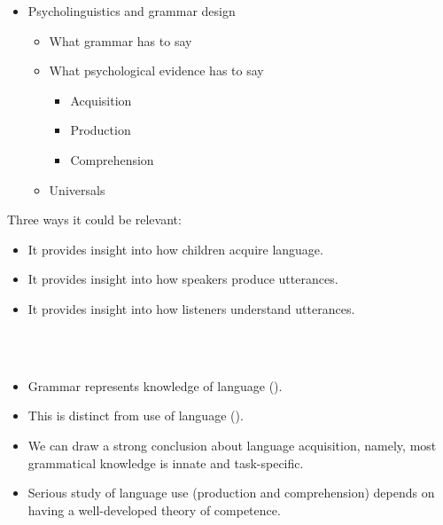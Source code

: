 \documentclass[a4paper,landscape,headrule,footrule]{foils}
\begin{document}
\maketitle



\begin{itemize}
\item Psycholinguistics and grammar design
  \begin{itemize}
  \item What grammar has to say
  \item What psychological evidence has to say
    \begin{itemize}
    \item Acquisition
    \item Production
    \item Comprehension
    \end{itemize}
  \item Universals
  \end{itemize}
\end{itemize}


Three ways it could be relevant:

\begin{itemize}
\item It provides insight into how children 
acquire language.
\item It provides insight into how speakers 
produce utterances. 
\item It provides insight into how listeners 
understand utterances. 
\end{itemize}


\vfill
\begin{center}\Large
  \\[3ex]
  \\[3ex]
\end{center}
\vfill
{}


\begin{itemize}
\item Grammar represents knowledge of language 
().
\item This is distinct from use of language ().
\item We can draw a strong conclusion about language 
acquisition, namely, most grammatical knowledge is 
innate and task-specific.
\item Serious study of language use (production and 
comprehension) depends on having a well-developed 
theory of competence.
\end{itemize}
\end{document}
